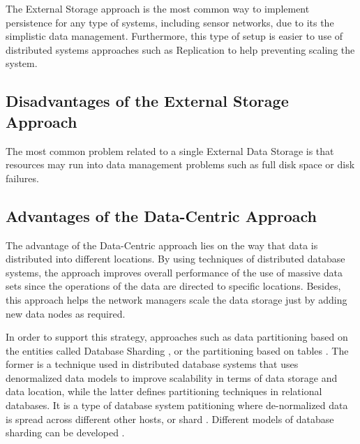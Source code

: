 The External Storage approach is the most common way to implement persistence
for any type of systems, including sensor networks, due to its the simplistic
data management. Furthermore, this type of setup is easier to use of
distributed systems approaches such as Replication to help preventing scaling
the system.

\subsection{Disadvantages of the External Storage Approach}

The most common problem related to a single External Data Storage is that
resources may run into data management problems such as full disk space or disk
failures.

\subsection{Advantages of the Data-Centric Approach}

The advantage of the Data-Centric approach lies on the way that data is
distributed into different locations. By using techniques of distributed
database systems, the approach improves overall performance of the use of
massive data sets since the operations of the data are directed to specific
locations. Besides, this approach helps the network managers scale the data
storage just by adding new data nodes as required.

In order to support this strategy, approaches such as data partitioning based
on the entities called Database Sharding
\cite{db-shard02}, or the partitioning based on tables
\cite{db-table-partition}. The former is a technique used in distributed
database systems that uses denormalized data models to improve scalability in
terms of data storage and data location, while the latter defines partitioning
techniques in relational databases. It is a type of database system patitioning
where de-normalized data is spread across different other hosts, or shard
\cite{db-shard01}. Different models of database sharding can be developed
\cite{db-shard-schemas}.

